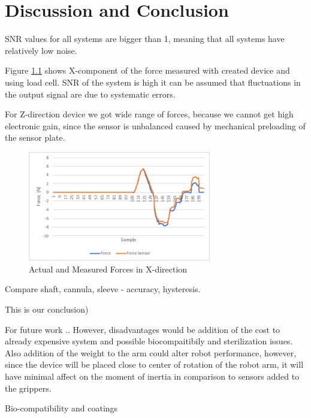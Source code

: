\chapter{Discussion and Conclusion}
\label{discuss} %

SNR values for all systems are bigger than 1, meaning that all systems have relatively low noise.

Figure \ref{fig:Syst_err} shows X-component of the force measured with created device and using load cell. SNR of the system is high  it can be assumed that fluctuations in the output signal are due to systematic errors. 

For Z-direction device we got wide range of forces, because we cannot get high electronic gain, since the sensor is unbalanced caused by mechanical preloading of the sensor plate.

\begin{figure}[h]
	\begin{center}
	\includegraphics[width=80mm]{fig/results/syst_error.pdf}
	\end{center}
	\vspace{-4mm}
	\caption[Actual and Measured Forces in X-direction]
	{Actual and Measured Forces in X-direction}
	\label{fig:Syst_err}
	\vspace{-2mm}
\end{figure}

Compare shaft, cannula, sleeve - accuracy, hysteresis.

This is our conclusion)

For future work ..
However, disadvantages would be addition of the cost to already expensive system and possible biocompaitibily and sterilization issues. Also addition of the weight to the arm could alter robot performance, however, since the device will be placed close to center of rotation of the robot arm, it will have minimal affect on the moment of inertia  in comparison to sensors added to the grippers.

Bio-compatibility and coatings


